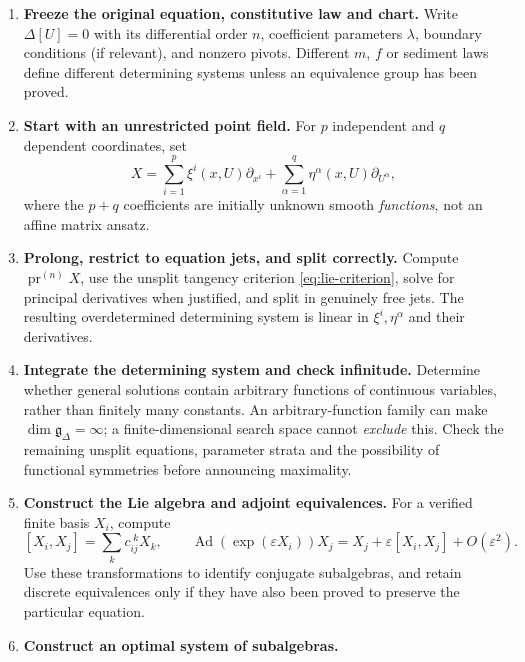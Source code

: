 \documentclass[12pt,a4paper,oneside]{report}
\numberwithin{equation}{chapter}
\theoremstyle{remark}\newtheorem{remark}[theorem]{Remark}
\begin{document}
\begin{enumerate}
 \item \textbf{Freeze the original equation, constitutive law and chart.}
   Write $\Delta[U]=0$ with its differential order $n$, coefficient
   parameters $\lambda$, boundary conditions (if relevant), and nonzero
   pivots. Different $m$, $f$ or sediment laws define different determining
   systems unless an equivalence group has been proved.
 \item \textbf{Start with an unrestricted point field.}
   For $p$ independent and $q$ dependent coordinates, set
   \begin{equation}\label{eq:general-point-field}
   X=\sum_{i=1}^{p}\xi^i(x,U)\partial_{x^i}
     +\sum_{\alpha=1}^{q}\eta^\alpha(x,U)\partial_{U^\alpha},
   \end{equation}
   where the $p+q$ coefficients are initially unknown smooth
   \emph{functions}, not an affine matrix ansatz.
 \item \textbf{Prolong, restrict to equation jets, and split correctly.}
   Compute $\operatorname{pr}^{(n)}X$, use the unsplit tangency criterion
   \eqref{eq:lie-criterion}, solve for principal derivatives when justified,
   and split in genuinely free jets. The resulting overdetermined determining
   system is linear in $\xi^i,\eta^\alpha$ and their derivatives.
 \item \textbf{Integrate the determining system and check infinitude.}
   Determine whether general solutions contain arbitrary functions of
   continuous variables, rather than finitely many constants. An
   arbitrary-function family can make $\dim\mathfrak g_\Delta=\infty$;
   a finite-dimensional search space cannot \emph{exclude} this. Check the
   remaining unsplit equations, parameter strata and the possibility of
   functional symmetries before announcing maximality.
 \item \textbf{Construct the Lie algebra and adjoint equivalences.}
   For a verified finite basis $X_i$, compute
   \begin{equation}\label{eq:brackets-and-adjoint}
     [X_i,X_j]=\sum_k c_{ij}^{\;k}X_k,\qquad
     \operatorname{Ad}(\exp(\varepsilon X_i))X_j
       =X_j+\varepsilon[X_i,X_j]+O(\varepsilon^2).
   \end{equation}
   Use these transformations to identify conjugate subalgebras, and retain
   discrete equivalences only if they have also been proved to preserve
   the particular equation.
 \item \textbf{Construct an optimal system of subalgebras.}

\end{enumerate}
\end{document}
